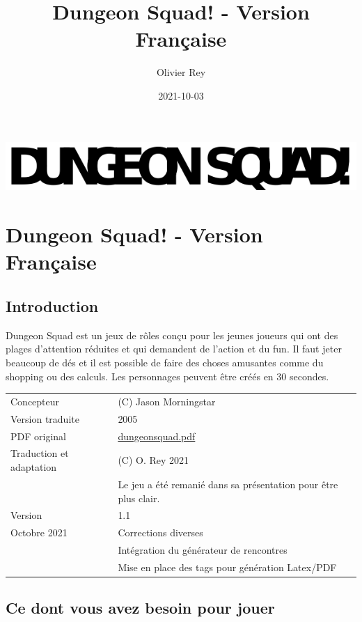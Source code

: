 \documentclass[a4paper, 11pt, twoside]{article}
\author{Olivier Rey}
\date{2021-10-03}
\title{Dungeon Squad! - Version Française}
\begin{document}
\maketitle
\tableofcontents

\newpage

\begin{center}
\includegraphics[width=.9\linewidth]{logo.png}
\end{center}

\section{Dungeon Squad! - Version Française}
\label{sec:org58b5e21}

\subsection{Introduction}
\label{sec:org04861fe}

Dungeon Squad est un jeux de rôles conçu pour les jeunes joueurs qui ont des plages d'attention réduites et qui demandent de l'action et du fun. Il faut jeter beaucoup de dés et il est possible de faire des choses amusantes comme du shopping ou des calculs. Les personnages peuvent être créés en 30 secondes.

\begin{longtable}{ll}
Concepteur & (C) Jason Morningstar\\
Version traduite & 2005\\
PDF original & \href{https://github.com/orey/jdr/blob/master/DungeonSquad-fr/dungeon\_squad.pdf}{dungeonsquad.pdf}\\
Traduction et adaptation & (C) O. Rey 2021\\
 & Le jeu a été remanié dans sa présentation pour être plus clair.\\
Version & 1.1\\
Octobre 2021 & Corrections diverses\\
 & Intégration du générateur de rencontres\\
 & Mise en place des tags pour génération Latex/PDF\\
\end{longtable}

\subsection{Ce dont vous avez besoin pour jouer}
\label{sec:org5da1d3c}
\end{document}
